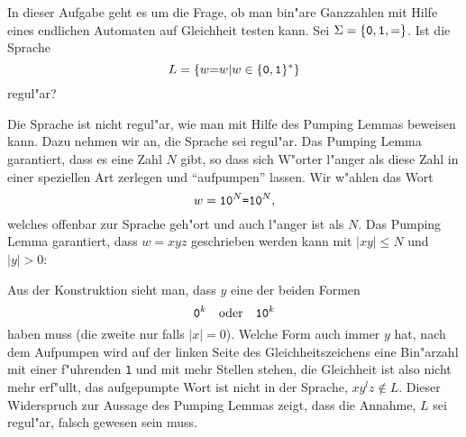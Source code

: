 In dieser Aufgabe geht es um die Frage, ob man bin"are Ganzzahlen mit
Hilfe eines endlichen Automaten auf Gleichheit testen kann.
Sei $\Sigma=\{{\tt 0},{\tt 1}, {\tt =}\}$. Ist die Sprache
\[
L=\{ w{\tt =}w|w\in \{{\tt 0},{\tt 1}\}^*\}
\]
regul"ar?

\begin{loesung}
Die Sprache ist nicht regul"ar, wie man mit Hilfe des Pumping
Lemmas beweisen kann. Dazu nehmen wir an, die Sprache sei regul"ar.
Das Pumping Lemma garantiert, dass es eine Zahl $N$ gibt, so dass
sich W"orter l"anger als diese Zahl in einer speziellen Art
zerlegen und ``aufpumpen'' lassen. Wir w"ahlen das Wort
\[
w=\text{\tt 10}^N\text{\tt =10}^N,
\]
welches offenbar zur Sprache geh"ort und auch l"anger ist als $N$.
Das Pumping Lemma garantiert, dass $w=xyz$  geschrieben werden kann
mit $|xy|\le N$ und $|y|>0$:
\begin{center}
\end{center}
Aus der Konstruktion sieht man, dass $y$ eine der beiden Formen
\[
\text{\tt 0}^k
\quad\text{oder}\quad
\text{\tt 10}^k
\]
haben muss (die zweite nur falls $|x|=0$).
Welche Form auch immer $y$ hat, nach dem Aufpumpen wird
auf der linken Seite des Gleichheitszeichens eine Bin"arzahl mit
einer f"uhrenden {\tt 1} und mit mehr Stellen stehen, die Gleichheit
ist also nicht mehr erf"ullt, das aufgepumpte Wort ist nicht in der
Sprache, $xy^lz\not\in L$. Dieser Widerspruch zur Aussage des Pumping
Lemmas zeigt, dass die Annahme, $L$ sei regul"ar, falsch gewesen
sein muss.
\end{loesung}


